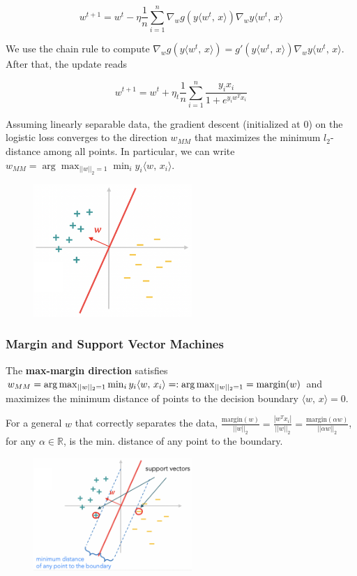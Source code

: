 \documentclass[a4paper]{extarticle}
\begin{document}
\[
    w^{t + 1} = w^t - \eta \frac{1}{n} \sum_{i = 1}^n \nabla_w g(y \langle w^t, \, x \rangle) \nabla_w y \langle w^t, \, x \rangle
\]

We use the chain rule to compute \(\nabla_w g(y \langle w^t, \, x \rangle) = g'(y \langle w^t, \, x \rangle)\nabla_w y \langle w^t, \, x \rangle\). After that, the update reads

\[
    w^{t + 1} = w^t + \eta_t \frac{1}{n} \sum_{i = 1}^n \frac{y_ix_i}{1 + e^{y_iw^Tx_i}}
\]

Assuming linearly separable data, the gradient descent (initialized at 0) on the logistic loss converges to the direction \(w_{MM}\) that maximizes the minimum \(l_2\)-distance among all points. In particular, we can write \(w_{MM} = \arg \max_{||w||_2 = 1} \min_i y_i \langle w, \, x_i \rangle\).

\begin{figure}[H]
    \includegraphics[width=6cm]{../images/IntroML_Fig4-6}
    \centering
\end{figure}

\subsubsection{Margin and Support Vector Machines}

The \textbf{max-margin direction} satisfies \(w_{MM} = \arg \max_{||w||_2 = 1} \min_i y_i \langle w, \, x_i \rangle =: \arg \max_{||w||_2 = 1} =\\ \text{margin}(w)\) and maximizes the minimum distance of points to the decision boundary \(\langle w, \, x \rangle = 0\).

For a general \(w\) that correctly separates the data, \(\frac{\text{margin}(w)}{||w||_2} = \frac{|w^Tx_i|}{||w||_2} = \frac{\text{margin}(\alpha w)}{||\alpha w ||_2}\), for any \(\alpha \in \mathbb{R}\), is the min. distance of any point to the boundary.

\begin{figure}[H]
    \includegraphics[width=6cm]{../images/IntroML_Fig4-7}
    \centering
\end{figure}
\end{document}
